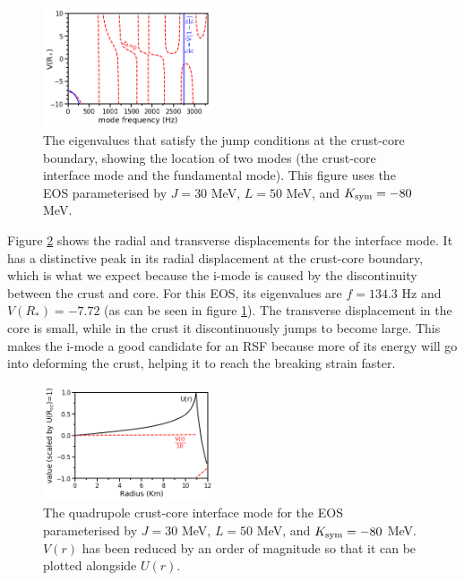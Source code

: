 \documentclass[fleqn,usenatbib]{mnras}
\begin{document}
\begin{figure}
\centering
\includegraphics[width=0.45\textwidth,angle=0]{minima_30_50_-80.png}
\caption{The eigenvalues that satisfy the jump conditions at the crust-core boundary, showing the location of two modes (the crust-core interface mode and the fundamental mode). This figure uses the EOS parameterised by $J=30$ MeV, $L=50$ MeV, and $K_{\rm sym}=-80$ MeV.}
\label{fig:trace_minima}
\end{figure}


Figure \ref{fig:2i_mode} shows the radial and transverse displacements for the interface mode. It has a distinctive peak in its radial displacement at the crust-core boundary, which is what we expect because the i-mode is caused by the discontinuity between the crust and core. For this EOS, its eigenvalues are $f=134.3$ Hz and $V(R_*)=-7.72$ (as can be seen in figure \ref{fig:trace_minima}). The transverse displacement in the core is small, while in the crust it discontinuously jumps to become large. This makes the i-mode a good candidate for an RSF because more of its energy will go into deforming the crust, helping it to reach the breaking strain faster.

\begin{figure}
\centering
\includegraphics[width=0.45\textwidth,angle=0]{2i2_30_50_-80.png}
\caption{The quadrupole crust-core interface mode for the EOS parameterised by $J=30$ MeV, $L=50$ MeV, and $K_{\rm sym}=-80$ MeV. $V(r)$ has been reduced by an order of magnitude so that it can be plotted alongside $U(r)$.}
\label{fig:2i_mode}
\end{figure}
\end{document}

